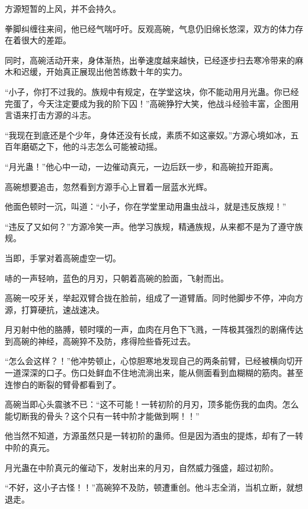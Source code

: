 
\begin{this_body}



方源短暂的上风，并不会持久。

拳脚纠缠往来间，他已经气喘吁吁。反观高碗，气息仍旧绵长悠深，双方的体力存在着很大的差距。

同时，高碗活动开来，身体渐热，出拳速度越来越快，已经逐步扫去寒冷带来的麻木和迟缓，开始真正展现出他苦练数十年的实力。

“小子，你打不过我的。族规中有规定，在学堂这块，你不能动用月光蛊。你已经完蛋了，今天注定要成为我的阶下囚！”高碗狰狞大笑，他战斗经验丰富，企图用言语来打击方源的斗志。

“我现在到底还是个少年，身体还没有长成，素质不如这豪奴。”方源心境如冰，五百年磨砺之下，他的斗志怎么可能被动摇。

“月光蛊！”他心中一动，一边催动真元，一边后跃一步，和高碗拉开距离。

高碗想要追击，忽然看到方源手心上冒着一层蓝水光辉。

他面色顿时一沉，叫道：“小子，你在学堂里动用蛊虫战斗，就是违反族规！”

“违反了又如何？”方源冷笑一声。他学习族规，精通族规，从来都不是为了遵守族规。

当即，手掌对着高碗虚空一切。

哧的一声轻响，蓝色的月刃，只朝着高碗的脸面，飞射而出。

高碗一咬牙关，举起双臂合拢在脸前，组成了一道臂盾。同时他脚步不停，冲向方源，打算硬抗，速战速决。

月刃射中他的胳膊，顿时噗的一声，血肉在月色下飞溅，一阵极其强烈的剧痛传达到高碗的神经，高碗猝不及防，疼得险些昏死过去。

“怎么会这样？！”他冲势顿止，心惊胆寒地发现自己的两条前臂，已经被横向切开一道深深的口子。伤口处鲜血不住地流淌出来，能从侧面看到血糊糊的筋肉。甚至连惨白的断裂的臂骨都看到了。

高碗当即心头震骇不已：“这不可能！一转初阶的月刃，顶多能伤我的血肉。怎么能切断我的骨头？这个只有一转中阶才能做到啊！！”

他当然不知道，方源虽然只是一转初阶的蛊师。但是因为酒虫的提炼，却有了一转中阶的真元。

月光蛊在中阶真元的催动下，发射出来的月刃，自然威力强盛，超过初阶。

“不好，这小子古怪！！”高碗猝不及防，顿遭重创。他斗志全消，当机立断，就想退走。


\end{this_body}
